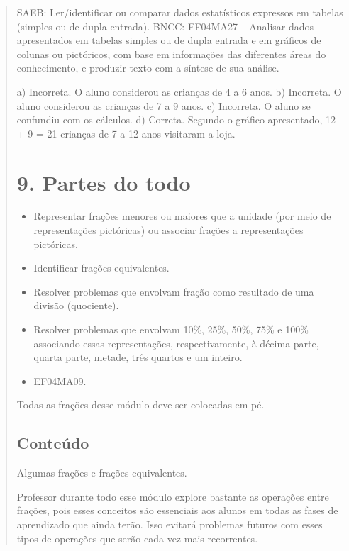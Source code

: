 \begin{enumerate}
\begin{escolha}
\begin{enumerate}
\begin{itemize}
\begin{itemize}
\begin{escolha}
\begin{quote}
\begin{escolha}
{SAEB: Ler/identificar ou comparar dados estatísticos expressos em tabelas (simples ou de dupla entrada).
BNCC: EF04MA27 -- Analisar dados apresentados em tabelas simples ou de dupla entrada e em gráficos de
colunas ou pictóricos, com base em informações das diferentes áreas do conhecimento, e produzir
texto com a síntese de sua análise.

a)  Incorreta. O aluno considerou as crianças de 4 a 6 anos.
b)  Incorreta. O aluno considerou as crianças de 7 a 9 anos.
c)  Incorreta. O aluno se confundiu com os cálculos.
d)  Correta. Segundo o gráfico apresentado, 12 + 9 = 21 crianças de 7 a 12 anos visitaram a loja.


\section{9. Partes do todo}\label{muxf3dulo-9}


\begin{itemize}
\item Representar frações menores ou maiores que a unidade (por meio de
representações pictóricas) ou associar frações a representações pictóricas.
\item Identificar frações equivalentes.
\item Resolver problemas que envolvam fração como resultado de uma divisão
(quociente).
\item Resolver problemas que envolvam 10\%, 25\%, 50\%, 75\% e 100\%
associando essas representações, respectivamente, à décima parte, quarta parte, metade,
três quartos e um inteiro.
\end{itemize}


\begin{itemize}
\item EF04MA09.
\end{itemize}

Todas as frações desse módulo deve ser colocadas em pé.

\subsection{Conteúdo}\label{conteuxfado-8}

Algumas frações e frações equivalentes.

Professor durante todo esse módulo explore bastante as operações entre
frações, pois esses conceitos são essenciais aos alunos em todas as
fases de aprendizado que ainda terão. Isso evitará problemas futuros com
esses tipos de operações que serão cada vez mais recorrentes.

}
\end{escolha}
\end{quote}
\end{escolha}
\end{itemize}
\end{itemize}
\end{enumerate}
\end{escolha}
\end{enumerate}
